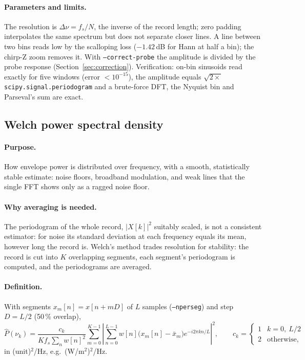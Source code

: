 \documentclass[10pt,letterpaper]{article}
\numberwithin{equation}{section}
\begin{document}
\paragraph{Parameters and limits.} The resolution is $\Delta\nu = f_s/N$, the
inverse of the record length; zero padding interpolates the same spectrum but
does not separate closer lines. A line between two bins reads low by the
scalloping loss ($-1.42$\,dB for Hann at half a bin); the chirp-Z zoom
removes it. With \texttt{--correct-probe} the amplitude is divided by the probe
response (Section~\ref{sec:correction}). Verification: on-bin sinusoids read
exactly for five windows (error $<10^{-15}$), the amplitude equals
$\sqrt{2\times}$\texttt{scipy.signal.periodogram} and a brute-force DFT, the
Nyquist bin and Parseval's sum are exact.

\subsection{Welch power spectral density}\label{sec:welch}
\paragraph{Purpose.} How envelope power is distributed over frequency, with a
smooth, statistically stable estimate: noise floors, broadband modulation, and
weak lines that the single FFT shows only as a ragged noise floor.

\paragraph{Why averaging is needed.} The periodogram of the whole record,
$|X[k]|^2$ suitably scaled, is not a consistent estimator: for noise its
standard deviation at each frequency equals its mean, however long the record
is. Welch's method \cite{R11} trades resolution for stability: the record is
cut into $K$ overlapping segments, each segment's periodogram is computed, and
the periodograms are averaged.

\paragraph{Definition.} With segments $x_m[n] = x[n + mD]$ of $L$ samples
(\texttt{--nperseg}) and step $D = L/2$ (50\,\% overlap),
\begin{equation}
\hat{P}(\nu_k) = \frac{c_k}{K f_s \sum_n w[n]^2}\sum_{m=0}^{K-1}
\left|\sum_{n=0}^{L-1} w[n]\big(x_m[n]-\bar{x}_m\big)e^{-i2\pi kn/L}\right|^2,
\qquad c_k = \begin{cases}1 & k = 0,\ L/2\\ 2 & \text{otherwise,}\end{cases}
\label{eq:welch}
\end{equation}
in (unit)$^2$/Hz, e.g.\ (W/m$^2$)$^2$/Hz.
\end{document}
